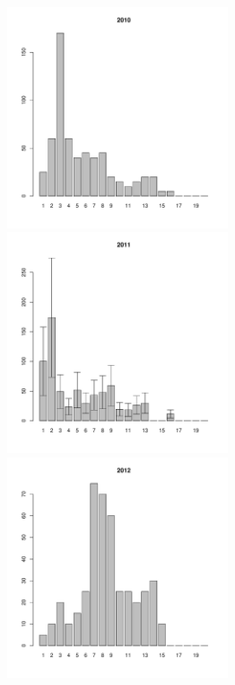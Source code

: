 \documentclass[12pt, a4paper]{article}
\begin{document}
\begin{figure}[h]

\begin{multicols}{3}
\hfill
\includegraphics[width=65mm]{../White_Sea/Luvenga_Goreliy/low_2010_.pdf}
\hfill
\end{multicols}

\begin{multicols}{3}
\hfill
\includegraphics[width=65mm]{../White_Sea/Luvenga_Goreliy/low_2011_.pdf}
\end{multicols}



\begin{multicols}{3}
\hfill
\includegraphics[width=65mm]{../White_Sea/Luvenga_Goreliy/low_2012_.pdf}
\end{multicols}


\end{figure}
\end{document}
